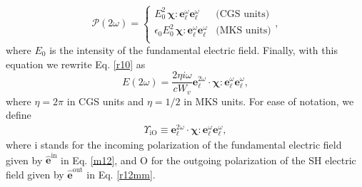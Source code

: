 \begin{equation}\label{m4}
\boldsymbol{\mathcal{P}}(2\omega) = 
\left\{
\begin{array}{cc}  
E^{2}_{0}\,
\boldsymbol{\chi}:\mathbf{e}^{\omega}_{\ell}\mathbf{e}^{\omega}_{\ell}
& \text{(CGS units)}\\
\epsilon_{0}E^{2}_{0}\,
\boldsymbol{\chi}:\mathbf{e}^{\omega}_{\ell}\mathbf{e}^{\omega}_{\ell}
& \text{(MKS units)}\\
\end{array}
\right.,
\end{equation}
where $E_{0}$ is the intensity of the fundamental electric field. Finally, with
this equation we rewrite Eq. \eqref{r10} as
\begin{equation}\label{mr10}
E(2\omega) 
= \frac{2\eta i \omega}{cW_{v}}
\mathbf{e}^{2\omega}_{\ell}\cdot
\boldsymbol{\chi}:\mathbf{e}^{\omega}_{\ell}\mathbf{e}^{\omega}_{\ell},
\end{equation}
where $\eta=2\pi$ in CGS units and $\eta=1/2$ in MKS units. For ease of
notation, we define
\begin{align}\label{mc0}
\Upsilon_{\mathrm{iO}}
\equiv 
\mathbf{e}^{2\omega}_{\ell}\cdot
\boldsymbol{\chi}:\mathbf{e}^{\omega}_{\ell}\mathbf{e}^{\omega}_{\ell},
\end{align}
where i stands for the incoming polarization of the fundamental electric field
given by $\hat{\mathbf{e}}^{\mathrm{in}}$ in Eq. \eqref{m12}, and O for the
outgoing polarization of the SH electric field given by
$\hat{\mathbf{e}}^{\mathrm{out}}$ in Eq. \eqref{r12mm}.

